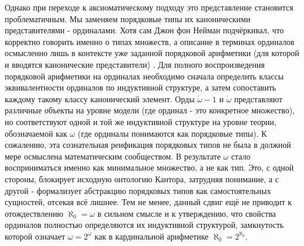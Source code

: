 \documentclass[12pt]{article}
\begin{document}
Однако при переходе к аксиоматическому подходу это представление становится проблематичным. Мы заменяем порядковые типы их каноническими представителями - ординалами. Хотя сам Джон фон Нейман подчёркивал, что корректно говорить именно о типах множеств, а описание в терминах ординалов осмысленно лишь в контексте уже заданной порядковой арифметики (для которой и вводятся канонические представители) \cite{von-neumann-ordinals}. Для полного воспроизведения порядковой арифметики на ординалах необходимо сначала определить классы эквивалентности ординалов по индуктивной структуре, а затем сопоставить каждому такому классу канонический элемент. Орды $\dot{\omega} - 1$ и $\dot{\omega}$ представляют различные объекты на уровне модели (где ординал - это конкретное множество), но соответствуют одной и той же индуктивной структуре на уровне теории, обозначаемой как $\omega$ (где ординалы понимаются как порядковые типы). К сожалению, эта сознательная реификация порядковых типов не была в должной мере осмыслена математическим сообществом. В результате $\omega$ стало восприниматься именно как минимальное множество, а не как тип. Это, с одной стороны, блокирует исходную онтологию Кантора, затрудняя понимание, а с другой - формализует абстракцию порядковых типов как самостоятельных сущностей, отсекая всё лишнее. Тем не менее, данный сдвиг ещё не приводит к отождествлению $\aleph_0 = \omega$ в сильном смысле и к утверждению, что свойства ординалов полностью определяются их индуктивной структурой, замкнутость которой означает $\omega = 2^{\omega}$ как в кардинальной арифметике $\aleph_0 = 2^{\aleph_0}$.
\end{document}
